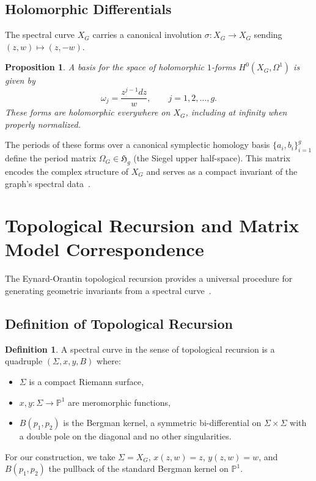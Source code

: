 \documentclass[12pt]{article}
\newtheorem{proposition}[theorem]{Proposition}
\theoremstyle{definition}
\newtheorem{definition}[theorem]{Definition}
\newcommand{\PP}{\mathbb{P}}
\begin{document}
\subsection{Holomorphic Differentials}
The spectral curve $X_G$ carries a canonical involution $\sigma: X_G \to X_G$ sending $(z,w) \mapsto (z,-w)$.

\begin{proposition}
A basis for the space of holomorphic $1$-forms $H^0(X_G,\Omega^1)$ is given by
\[
\omega_j = \frac{z^{j-1} dz}{w}, \qquad j = 1, 2, \dots, g.
\]
These forms are holomorphic everywhere on $X_G$, including at infinity when properly normalized.
\end{proposition}

The periods of these forms over a canonical symplectic homology basis $\{a_i, b_i\}_{i=1}^g$ define the period matrix $\Omega_G \in \mathfrak{H}_g$ (the Siegel upper half-space). This matrix encodes the complex structure of $X_G$ and serves as a compact invariant of the graph's spectral data~\cite{Griffiths2014}.

\section{Topological Recursion and Matrix Model Correspondence}
The Eynard-Orantin topological recursion provides a universal procedure for generating geometric invariants from a spectral curve~\cite{Eynard2007, Eynard2014}.

\subsection{Definition of Topological Recursion}
\begin{definition}
A spectral curve in the sense of topological recursion is a quadruple $(\Sigma, x, y, B)$ where:
\begin{itemize}
 \item $\Sigma$ is a compact Riemann surface,
 \item $x, y: \Sigma \to \PP^1$ are meromorphic functions,
 \item $B(p_1,p_2)$ is the Bergman kernel, a symmetric bi-differential on $\Sigma \times \Sigma$ with a double pole on the diagonal and no other singularities.
\end{itemize}
\end{definition}

For our construction, we take $\Sigma = X_G$, $x(z,w) = z$, $y(z,w) = w$, and $B(p_1,p_2)$ the pullback of the standard Bergman kernel on $\PP^1$.
\end{document}
